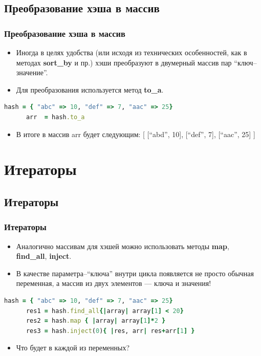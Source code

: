 \documentclass[compress,red]{beamer}
\begin{document}
\subsection{Преобразование хэша в массив}
\begin{frame}[fragile]
  \frametitle{Преобразование хэша в массив}

  \begin{itemize}
    \item Иногда в целях удобства (или исходя из технических особенностей, как в методах \textbf{sort\_by} и пр.) хэши преобразуют в двумерный массив пар ``ключ--значение''.
    \item Для преобразования используется метод \textbf{to\_a}.
  \end{itemize}

  \scriptsize{
    \begin{lstlisting}[language=ruby,basicstyle=\footnotesize,label=ruby7,caption=Преобразование в массив]
      hash = { "abc" => 10, "def" => 7, "aac" => 25}
      arr  = hash.to_a
    \end{lstlisting}
  }

  \begin{itemize}
    \item В итоге в массив arr будет следующим: [ [``abd'', 10], [``def'', 7], [``aac'', 25] ]
  \end{itemize}
  
\end{frame}

\section{Итераторы}
\subsection{Итераторы}
\begin{frame}[fragile]
  \frametitle{Итераторы}

  \begin{itemize}
    \item Аналогично массивам для хэшей можно использовать методы \textbf{map}, \textbf{find\_all}, \textbf{inject}.
    \item В качестве параметра--``ключа'' внутри цикла появляется не просто обычная переменная, а массив из двух элементов --- ключа и значения!
  \end{itemize}

  \scriptsize{
    \begin{lstlisting}[language=ruby,basicstyle=\footnotesize,label=ruby8,caption=Итераторы]
      hash = { "abc" => 10, "def" => 7, "aac" => 25}
      res1 = hash.find_all{|array| array[1] < 20} 
      res2 = hash.map { |array| array[1]*2 }
      res3 = hash.inject(0){ |res, arr| res+arr[1] }
    \end{lstlisting}
  }

  \begin{itemize}
    \item Что будет в каждой из переменных?
  \end{itemize}

\end{frame}
\end{document}

